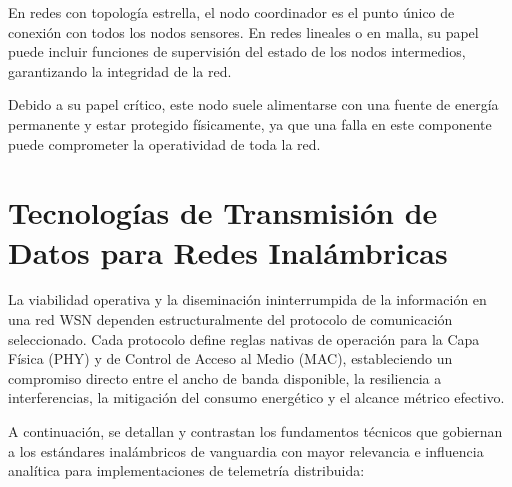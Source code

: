 En redes con topología estrella, el nodo coordinador es el punto único de conexión con todos los nodos sensores. En redes lineales o en malla, su papel puede incluir funciones de supervisión del estado de los nodos intermedios, garantizando la integridad de la red.

Debido a su papel crítico, este nodo suele alimentarse con una fuente de energía permanente y estar protegido físicamente, ya que una falla en este componente puede comprometer la operatividad de toda la red.


\section{Tecnologías de Transmisión de Datos para Redes Inalámbricas}

La viabilidad operativa y la diseminación ininterrumpida de la información en una red WSN dependen estructuralmente del protocolo de comunicación seleccionado. Cada protocolo define reglas nativas de operación para la Capa Física (PHY) y de Control de Acceso al Medio (MAC), estableciendo un compromiso directo entre el ancho de banda disponible, la resiliencia a interferencias, la mitigación del consumo energético y el alcance métrico efectivo.

A continuación, se detallan y contrastan los fundamentos técnicos que gobiernan a los estándares inalámbricos de vanguardia con mayor relevancia e influencia analítica para implementaciones de telemetría distribuida:

